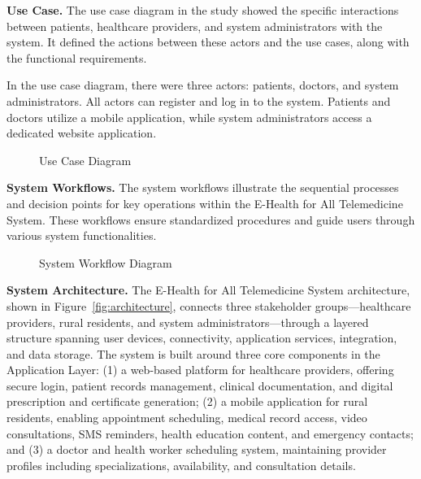 \documentclass{research}
\begin{document}
\textbf{Use Case.} The use case diagram in the study showed the specific interactions between
patients, healthcare providers, and system administrators with the system. It defined the actions
between these actors and the use cases, along with the functional requirements.

In the use case diagram, there were three actors: patients, doctors, and system administrators.
All actors can register and log in to the system. Patients and doctors utilize a mobile
application, while system administrators access a dedicated website application.

\begin{figure}[H]
  \centering
  \caption{Use Case Diagram}
  \label{fig:usecase}
\end{figure}

\textbf{System Workflows.} The system workflows illustrate the sequential processes and decision
points for key operations within the E-Health for All Telemedicine System. These workflows ensure
standardized procedures and guide users through various system functionalities.

\begin{figure}[H]
  \centering
  \caption{System Workflow Diagram}
  \label{fig:workflow}
\end{figure}

\textbf{System Architecture.} The E-Health for All Telemedicine System architecture, shown in
Figure~\ref{fig:architecture}, connects three stakeholder groups---healthcare providers, rural
residents, and system administrators---through a layered structure spanning user devices,
connectivity, application services, integration, and data storage. The system is built around
three core components in the Application Layer: (1) a web-based platform for healthcare providers,
offering secure login, patient records management, clinical documentation, and digital prescription
and certificate generation; (2) a mobile application for rural residents, enabling appointment
scheduling, medical record access, video consultations, SMS reminders, health education content,
and emergency contacts; and (3) a doctor and health worker scheduling system, maintaining provider
profiles including specializations, availability, and consultation details.
\end{document}
